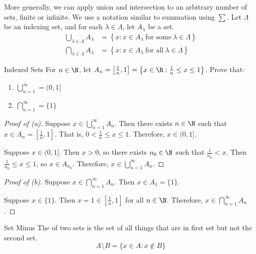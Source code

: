 More generally, we can apply union and intersection to an arbitrary number of sets, finite or infinite. We use a notation similar to summation using $\sum$. Let $\Lambda$ be an indexing set, and for each $\lambda \in \Lambda$, let $A_\lambda$ be a set.
\begin{align*}
    \bigcup_{\lambda \in \Lambda} A_\lambda &= \left\{ x : x \in A_\lambda\ \text{for some}\ \lambda \in \Lambda \right\} \\
    \bigcap_{\lambda \in \Lambda} A_\lambda &= \left\{ x : x \in A_\lambda\ \text{for all}\ \lambda \in \Lambda \right\}
\end{align*}
\begin{exbox}{Indexed Sets}{}
    For $n \in \N$, let $A_n = \left[ \frac{1}{n}, 1 \right] = \left\{ x \in \R : \frac{1}{n} \leq x \leq 1 \right\}$. Prove that:
    \begin{enumerate}[label=(\alph*)]
        \item $\bigcup_{n=1}^\infty = (0,1]$
        \item $\bigcap_{n=1}^\infty = \{1\}$
    \end{enumerate}
    \tcblower
    \begin{proof}[Proof of (a)]
        Suppose $x \in \bigcup_{n=1}^\infty A_n$. Then there exists $n \in \N$ such that $x \in A_n = \left[ \frac{1}{n}, 1 \right]$. That is, $0 < \frac{1}{n} \leq x \leq 1$. Therefore, $x \in (0, 1]$.

        Suppose $x \in (0, 1]$. Then $x > 0$, so there exists $n_0 \in \N$ such that $\frac{1}{n_0} < x$. Then $\frac{1}{n_0} \leq x \leq 1$, so $x \in A_{n_0}$. Therefore, $x \in \bigcup_{n=1}^\infty A_n$.
    \end{proof}

    \begin{proof}[Proof of (b)]
        Suppose $x \in \bigcap_{n=1}^\infty A_n$. Then $x \in A_1 = \{1\}$.

        Suppose $x \in \{1\}$. Then $x = 1 \in \left[ \frac{1}{n}, 1 \right]$ for all $n \in \N$. Therefore, $x \in \bigcap_{n=1}^\infty A_n$.
    \end{proof}
\end{exbox}

\begin{dfnbox}{Set Minus}{}
    The  of two sets is the set of all things that are in first set but not the second set.
    \tcblower
    \[ A \setminus B = \{ x \in A : x \notin B \} \]
\end{dfnbox}

